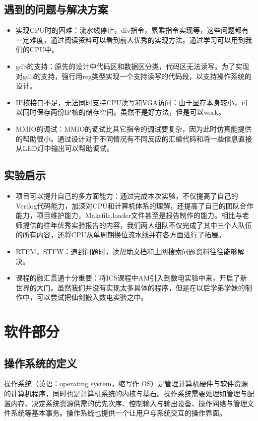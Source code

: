 \section{遇到的问题与解决方案}
    \begin{itemize}
        \item 实现CPU时的困难：流水线停止，div指令，累乘指令实现等，这些问题都有一定难度，通过阅读资料可以看到前人优秀的实现方法。通过学习可以用到我们的CPU中。
        \item gdb的支持：原先的设计中代码区和数据区分类，代码区无法读写。为了实现对gdb的支持，强行用reg类型实现一个支持读写的代码段，以支持操作系统的设计。
        \item IP核接口不足，无法同时支持CPU读写和VGA访问：由于显存本身较小，可以同时保存两份IP核的储存空间。虽然不是好方法，但是可以work。
        \item MMIO的调试：MMIO的调试比其它指令的调试要复杂，因为此时仿真能提供的帮助很小。通过设计对于不同情况有不同反应的汇编代码和将一些信息直接从LED灯中输出可以帮助调试。
    \end{itemize}
\section{实验启示}
    \begin{itemize}
        \item 项目可以提升自己的多方面能力：通过完成本次实验，不仅提高了自己的Verilog代码能力，加深对CPU和计算机体系的理解，还提高了自己的团队合作能力，项目维护能力，Makefile,loader文件甚至是报告制作的能力。相比与老师提供的往年优秀实验报告的内容，我们两人组队不仅完成了其中三个人队伍的所有内容，还将CPU从单周期换位流水线并在各方面进行了拓展。
        \item RTFM，STFW：遇到问题时，读帮助文档和上网搜索问题资料往往能够解决。
        \item 课程的融汇贯通十分重要：将ICS课程中AM引入到数电实验中来，开启了新世界的大门。虽然我们并没有实现太多具体的程序，但是在以后学弟学妹的制作中，可以尝试把仙剑搬入数电实验之中。
    \end{itemize}

\chapter{软件部分}
\section{操作系统的定义}
    操作系统（英语：operating system，缩写作 OS）是管理计算机硬件与软件资源的计算机程序，同时也是计算机系统的内核与基石。操作系统需要处理如管理与配置内存、决定系统资源供需的优先次序、控制输入与输出设备、操作网络与管理文件系统等基本事务。操作系统也提供一个让用户与系统交互的操作界面。
